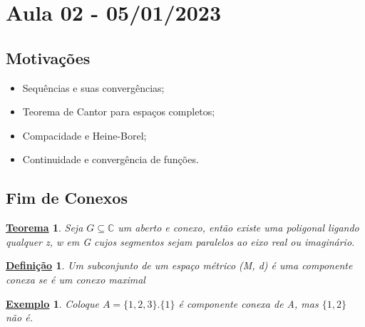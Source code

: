 \documentclass{article}
\newtheorem*{def*}{\underline{Defini\c c\~ao}}
\newtheorem*{theorem*}{\underline{Teorema}}
\newtheorem{example}{\underline{Exemplo}}[section]
\begin{document}
\section{Aula 02 - 05/01/2023}
\subsection{Motiva\c c\~oes}
\begin{itemize}
  \item Sequ\^encias e suas converg\^encias;
  \item Teorema de Cantor para espa\c cos completos;
  \item Compacidade e Heine-Borel;
  \item Continuidade e converg\^encia de fun\c c\~oes.
\end{itemize}

\subsection{Fim de Conexos}
\begin{theorem*}
  Seja $G\subseteq{\mathbb{C}}$ um aberto e conexo, ent\~ao existe uma poligonal ligando qualquer z, w em G cujos segmentos
  sejam paralelos ao eixo real ou imagin\'ario.
\end{theorem*}

\begin{def*}
  Um subconjunto de um espa\c co m\'etrico (M, d) \'e uma componente conexa se \'e um conexo maximal
\end{def*}

\begin{example}
Coloque $A = \{1, 2, 3\}. \{1\}$ \'e componente conexa de A, mas $\{1, 2\}$ n\~ao \'e. 
 \end{example}
\end{document}
